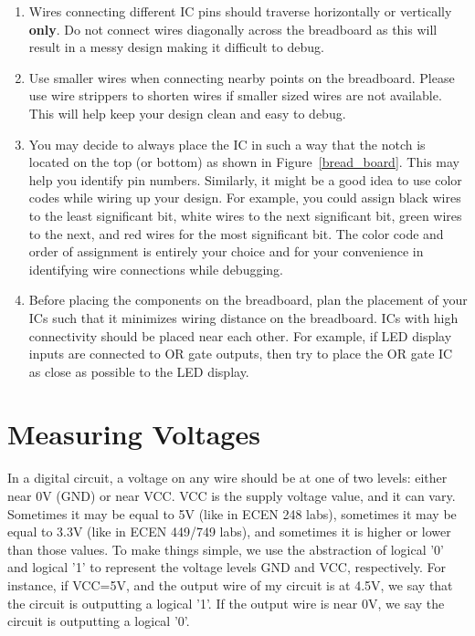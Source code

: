 \documentclass[11pt,twoside,titlepage]{article}
\begin{document}
\begin{enumerate}
	\item Wires connecting different IC pins should traverse horizontally or vertically \textbf{only}. Do not connect wires diagonally across the breadboard as this will result in a messy design making it difficult to debug.
	
	\item Use smaller wires when connecting nearby points on the breadboard. Please use wire strippers to shorten wires if smaller sized wires are not available. This will help keep your design clean and easy to debug.
	
	\item You may decide to always place the IC in such a way that the notch is located on the top (or bottom) as shown in Figure~\ref{bread_board}. This may help you identify pin numbers. Similarly, it might be a good idea to use color codes while wiring up your design. For example, you could assign black wires to the least significant bit, white wires to the next significant bit, green wires to the next, and red wires for the most significant bit. The color code and order of assignment is entirely your choice and for your convenience in identifying wire connections while debugging.
	
	\item Before placing the components on the breadboard, plan the placement of your ICs such that it minimizes wiring distance on the breadboard. ICs with high connectivity should be placed near each other. For example, if LED display inputs are connected to OR gate outputs, then try to place the OR gate IC as close as possible to the LED display.
\end{enumerate}


\section{Measuring Voltages}

\noindent
In a digital circuit, a voltage on any wire should be at one of two levels: either near 0V (GND) or near VCC. VCC is the supply voltage value, and it can vary. Sometimes it may be equal to 5V (like in ECEN 248 labs), sometimes it may be equal to 3.3V (like in ECEN 449/749 labs), and sometimes it is higher or lower than those values. To make things simple, we use the abstraction of logical '0' and logical '1' to represent the voltage levels GND and VCC, respectively. For instance, if VCC=5V, and the output wire of my circuit is at 4.5V, we say that the circuit is outputting a logical '1'. If the output wire is near 0V, we say the circuit is outputting a logical '0'.\\
\end{document}

